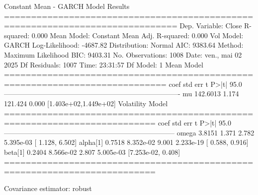                      Constant Mean - GARCH Model Results                      
==============================================================================
Dep. Variable:                  Close   R-squared:                       0.000
Mean Model:             Constant Mean   Adj. R-squared:                  0.000
Vol Model:                      GARCH   Log-Likelihood:               -4687.82
Distribution:                  Normal   AIC:                           9383.64
Method:            Maximum Likelihood   BIC:                           9403.31
                                        No. Observations:                 1008
Date:               ven., mai 02 2025   Df Residuals:                     1007
Time:                        23:31:57   Df Model:                            1
                                 Mean Model                                 
============================================================================
                 coef    std err          t      P>|t|      95.0%
----------------------------------------------------------------------------
mu           142.6013      1.174    121.424      0.000 [1.403e+02,1.449e+02]
                             Volatility Model                             
==========================================================================
                 coef    std err          t      P>|t|    95.0%
--------------------------------------------------------------------------
omega          3.8151      1.371      2.782  5.395e-03   [  1.128,  6.502]
alpha[1]       0.7518  8.352e-02      9.001  2.233e-19   [  0.588,  0.916]
beta[1]        0.2404  8.566e-02      2.807  5.005e-03 [7.253e-02,  0.408]
==========================================================================

Covariance estimator: robust